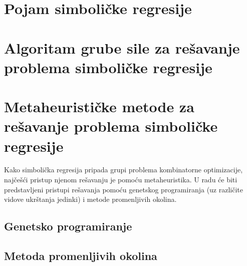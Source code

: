 \documentclass[12pt,oneside]{memoir}
\begin{document}
\chapter{Pojam simboličke regresije}
\label{chp:symReg}



\newpage


\chapter{Algoritam grube sile za rešavanje problema simboličke regresije}
\label{chp:bruteForce}


\newpage


\chapter{Metaheurističke metode za rešavanje problema simboličke regresije}
\label{chp:metaheuristike}

Kako simbolička regresija pripada grupi problema kombinatorne optimizacije, najčešći pristup njenom rešavanju je pomoću metaheuristika. U radu će biti predstavljeni pristupi rešavanja pomoću genetskog programiranja (uz različite vidove ukrštanja jedinki) i metode promenljivih okolina.

\section{Genetsko programiranje}
\label{sec:gp}


\newpage


\section{Metoda promenljivih okolina}
\label{sec:vnp}


\newpage

\end{document}
